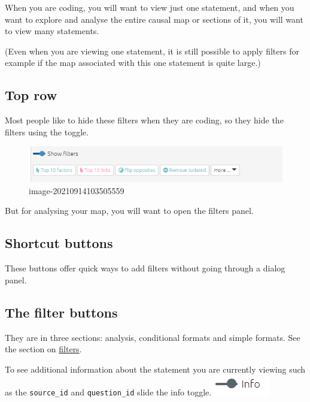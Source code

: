 \documentclass[
]{book}
\begin{document}
When you are coding, you will want to view just one statement, and when you want to explore and analyse the entire causal map or sections of it, you will want to view many statements.

(Even when you are viewing one statement, it is still possible to apply filters for example if the map associated with this one statement is quite large.)

\hypertarget{top-row}{%
\subsection{Top row}\label{top-row}}

Most people like to hide these filters when they are coding, so they hide the filters using the toggle.

\begin{figure}
\centering
\includegraphics{_assets/image-20210914103505559.png}
\caption{image-20210914103505559}
\end{figure}

But for analysing your map, you will want to open the filters panel.

\hypertarget{shortcut-buttons}{%
\subsection{Shortcut buttons}\label{shortcut-buttons}}

These buttons offer quick ways to add filters without going through a dialog panel.

\hypertarget{the-filter-buttons-1}{%
\subsection{The filter buttons}\label{the-filter-buttons-1}}

They are in three sections: analysis, conditional formats and simple formats. See the section on \href{https://guide.causalmap.app/all-the-filters.html}{filters}.

To see additional information about the statement you are currently viewing such as the \texttt{source\_id} and \texttt{question\_id} slide the info toggle.\includegraphics{_assets/image-20211220153438354.png}
\end{document}
